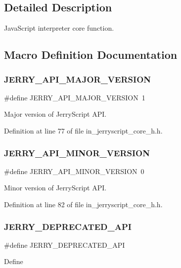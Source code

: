 \subsection{Detailed Description}
Java\+Script interpreter core function. 



\subsection{Macro Definition Documentation}
\mbox{\label{group___core_gac58bf36209204c6834a0fb026e9f1809}} 
\subsubsection{JERRY\_API\_MAJOR\_VERSION}
{\footnotesize\ttfamily \#define J\+E\+R\+R\+Y\+\_\+\+A\+P\+I\+\_\+\+M\+A\+J\+O\+R\+\_\+\+V\+E\+R\+S\+I\+ON~1}

Major version of Jerry\+Script A\+PI. 

Definition at line 77 of file in\+\_\+jerryscript\+\_\+core\+\_\+h.\+h.

\mbox{\label{group___core_gae6a027fb516332a690ac085a70c125e9}} 
\subsubsection{JERRY\_API\_MINOR\_VERSION}
{\footnotesize\ttfamily \#define J\+E\+R\+R\+Y\+\_\+\+A\+P\+I\+\_\+\+M\+I\+N\+O\+R\+\_\+\+V\+E\+R\+S\+I\+ON~0}

Minor version of Jerry\+Script A\+PI. 

Definition at line 82 of file in\+\_\+jerryscript\+\_\+core\+\_\+h.\+h.

\mbox{\label{group___core_ga879219ce984c994b6e9d4a6aaa4794c4}} 
\subsubsection{JERRY\_DEPRECATED\_API}
{\footnotesize\ttfamily \#define J\+E\+R\+R\+Y\+\_\+\+D\+E\+P\+R\+E\+C\+A\+T\+E\+D\+\_\+\+A\+PI}

Define 

